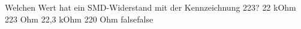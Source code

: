     {Welchen Wert hat ein SMD-Widerstand mit der Kennzeichnung 223?}
    {22 kOhm}
    {223 Ohm}
    {22,3 kOhm}
    {220 Ohm}
    {false}{false}